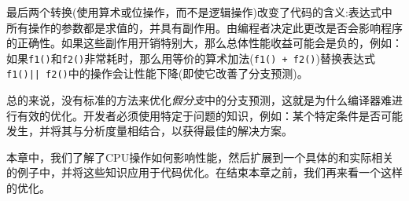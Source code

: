 最后两个转换(使用算术或位操作，而不是逻辑操作)改变了代码的含义:表达式中所有操作的参数都是求值的，并具有副作用。由编程者决定此更改是否会影响程序的正确性。如果这些副作用开销特别大，那么总体性能收益可能会是负的，例如：如果\texttt{f1()}和\texttt{f2()}非常耗时，那么用等价的算术加法(\texttt{f1() + f2()})替换表达式\texttt{f1()|| f2()}中的操作会让性能下降(即使它改善了分支预测)。

总的来说，没有标准的方法来优化\textit{假分支}中的分支预测，这就是为什么编译器难进行有效的优化。开发者必须使用特定于问题的知识，例如：某个特定条件是否可能发生，并将其与分析度量相结合，以获得最佳的解决方案。

本章中，我们了解了CPU操作如何影响性能，然后扩展到一个具体的和实际相关的例子中，并将这些知识应用于代码优化。在结束本章之前，我们再来看一个这样的优化。



























